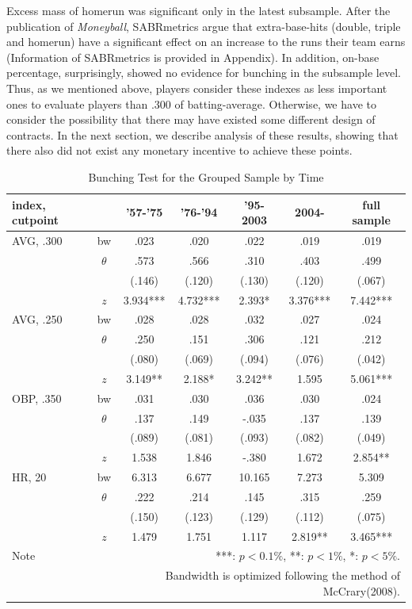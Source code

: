 \documentclass[dvipdfmx, 12pt]{article}
\begin{document}
Excess mass of homerun was significant only in the latest subsample. After the publication of \textit{Moneyball}, SABRmetrics argue that extra-base-hits (double, triple and homerun) have a significant effect on an increase to the runs their team earns (Information of SABRmetrics is provided in Appendix). In addition, on-base percentage, surprisingly, showed no evidence for bunching in the subsample level. Thus, as we mentioned above, players consider these indexes as less important ones to evaluate players than .300 of batting-average. Otherwise, we have to consider the possibility that there may have existed some different design of contracts. In the next section, we describe analysis of these results, showing that there also did not exist any monetary incentive to achieve these points.

\begin{table}[H]
  \centering
  \caption{Bunching Test for the Grouped Sample by Time}
  \label{Mani-Era}
  \footnotesize
  \begin{tabular}{lcccccc} \hline
    index, cutpoint &  & '57-'75 &'76-'94 & '95-2003 & 2004- &full sample \\ \hline \hline
    AVG, .300 & bw & .023 & .020 & .022 & .019 & .019 \\
    & $\theta$ & .573 & .566 & .310 & .403 & .499 \\
    & & (.146) & (.120) & (.130) & (.120) & (.067) \\
    & $z$ & 3.934*** & 4.732*** & 2.393* & 3.376*** & 7.442*** \\ \hline
    AVG, .250 & bw & .028 & .028 & .032 & .027 & .024 \\
    & $\theta$ & .250 & .151 & .306 & .121 & .212 \\
    & & (.080) & (.069) & (.094)& (.076) & (.042) \\
    & $z$ & 3.149** & 2.188* & 3.242** & 1.595 & 5.061*** \\ \hline
    OBP, .350 & bw & .031 & .030 & .036 & .030 & .024 \\
    & $\theta$ & .137 & .149 & -.035 & .137 & .139 \\
    & & (.089) & (.081) & (.093) & (.082) & (.049) \\
    & $z$ & 1.538 & 1.846 & -.380 & 1.672 & 2.854** \\ \hline
    HR, 20 & bw & 6.313 & 6.677 & 10.165 & 7.273 & 5.309 \\
    & $\theta$ & .222 & .214 & .145 & .315 & .259 \\
    & & (.150) & (.123) & (.129) & (.112) & (.075) \\
    & $z$ & 1.479 & 1.751 & 1.117 & 2.819** & 3.465*** \\ \hline
    Note & \multicolumn{6}{r}{
    ***: $p<0.1\%$, **: $p<1\%$, *: $p<5\%$.
    }\\
    & \multicolumn{6}{r}{
    Bandwidth is optimized following the method of McCrary(2008).
    }
  \end{tabular}
\end{table}
\end{document}
